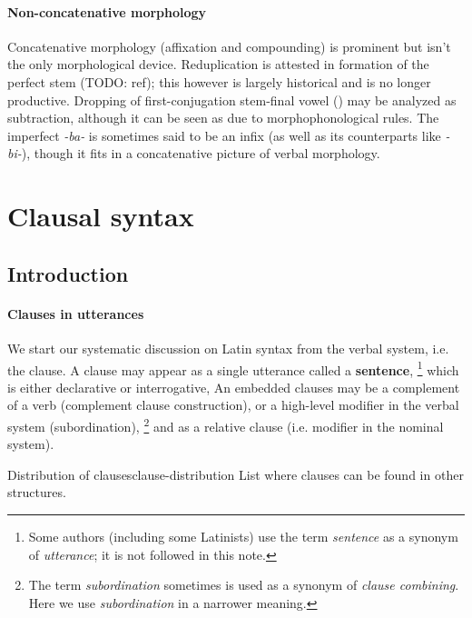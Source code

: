 \documentclass[a4paper, oneside, 12pt]{report}
\newcommand*{\concept}[1]{\textbf{#1}}
\newcommand*{\term}[1]{\emph{#1}}
\newcommand{\form}[1]{\emph{#1}}
\begin{document}
\paragraph*{Non-concatenative morphology}

Concatenative morphology (affixation and compounding) 
is prominent but isn't the only morphological device.
Reduplication is attested in 
formation of the perfect stem (TODO: ref);
this however is largely historical 
and is no longer productive.
Dropping of first-conjugation stem-final vowel ()
may be analyzed as subtraction,
although it can be seen as due to morphophonological rules.
The imperfect \form{-ba-} is sometimes said to be an infix 
(as well as its counterparts like \form{-bi-}),
though it fits in a concatenative picture of verbal morphology.


\section{Clausal syntax}\label{sec:grammatical.clause}

\subsection{Introduction}

\paragraph*{Clauses in utterances}\label{sec:grammatical.clause.introduction.utterance}
We start our systematic discussion on Latin syntax from the verbal system, i.e. the clause. 
A clause may appear as a single utterance called a \concept{sentence},%
\footnote{
    Some authors (including some Latinists) use the term \term{sentence}
    as a synonym of \term{utterance};
    it is not followed in this note.
}
which is either declarative or interrogative,
An embedded clauses may be a complement of a verb (complement clause construction),
or a high-level modifier in the verbal system (subordination),%
\footnote{
    The term \term{subordination} sometimes is used as a synonym of \term{clause combining}.
    Here we use \term{subordination} in a narrower meaning.
}
and as a relative clause 
(i.e. modifier in the nominal system).

\begin{todobox}{Distribution of clauses}{clause-distribution}
    List where clauses can be found in other structures.
\end{todobox}
\end{document}
